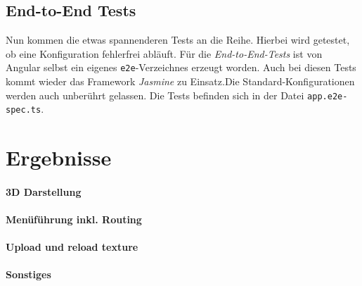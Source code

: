 \subsection{End-to-End Tests}
%
Nun kommen die etwas spannenderen Tests an die Reihe. Hierbei wird getestet, ob eine Konfiguration fehlerfrei abläuft. Für die \textit{End-to-End-Tests} ist von Angular selbst ein eigenes \texttt{e2e}-Verzeichnes erzeugt worden. Auch bei diesen Tests kommt wieder das Framework \textit{Jasmine} zu Einsatz.Die Standard-Konfigurationen werden auch unberührt gelassen. Die Tests befinden sich in der Datei \texttt{app.e2e-spec.ts}.

\section{Ergebnisse}
\paragraph{3D Darstellung}
\paragraph{Menüführung inkl. Routing}
\paragraph{Upload und reload texture}
\paragraph{Sonstiges}